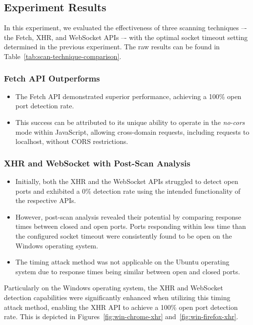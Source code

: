 \subsection{Experiment Results}

In this experiment, we evaluated the effectiveness of three scanning techniques –- the Fetch, XHR, and WebSocket APIs –- with the optimal socket timeout setting determined in the previous experiment. The raw results can be found in Table~\ref{tab:scan-technique-comparison}.

\subsubsection{Fetch API Outperforms}

\begin{itemize}
    \item The Fetch API demonstrated superior performance, achieving a 100\% open port detection rate.
    \item This success can be attributed to its unique ability to operate in the \emph{no-cors} mode within JavaScript, allowing cross-domain requests, including requests to localhost, without CORS restrictions.
\end{itemize}

\subsubsection{XHR and WebSocket with Post-Scan Analysis}

\begin{itemize}
    \item Initially, both the XHR and the WebSocket APIs struggled to detect open ports and exhibited a 0\% detection rate using the intended functionality of the respective APIs.
    \item However, post-scan analysis revealed their potential by comparing response times between closed and open ports. Ports responding within less time than the configured socket timeout were consistently found to be open on the Windows operating system.
    \item The timing attack method was not applicable on the Ubuntu operating system due to response times being similar between open and closed ports.
\end{itemize}

Particularly on the Windows operating system, the XHR and WebSocket  detection capabilities were significantly enhanced when utilizing this timing attack method, enabling the XHR API to achieve a 100\% open port detection rate. This is depicted in Figures~\ref{fig:win-chrome-xhr} and~\ref{fig:win-firefox-xhr}.

